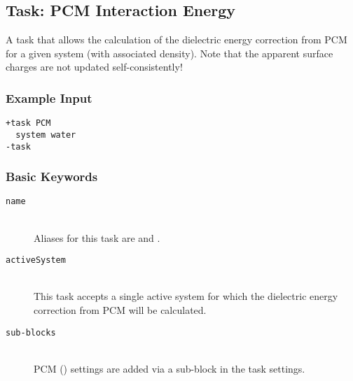\subsection{Task: PCM Interaction Energy}
A task that allows the calculation of the dielectric energy correction from PCM for a given system (with associated density). Note that the apparent surface charges are not updated self-consistently!
\subsubsection{Example Input}
\begin{lstlisting}
+task PCM
  system water
-task
\end{lstlisting}

\subsubsection{Basic Keywords}
\begin{description}
    \item [\texttt{name}]\hfill \\
    Aliases for this task are  and .
    \item [\texttt{activeSystem}]\hfill \\
    This task accepts a single active system for which the dielectric energy correction from PCM will be calculated.
    \item [\texttt{sub-blocks}]\hfill \\
    PCM () settings are added via a sub-block in the task settings.    
\end{description}